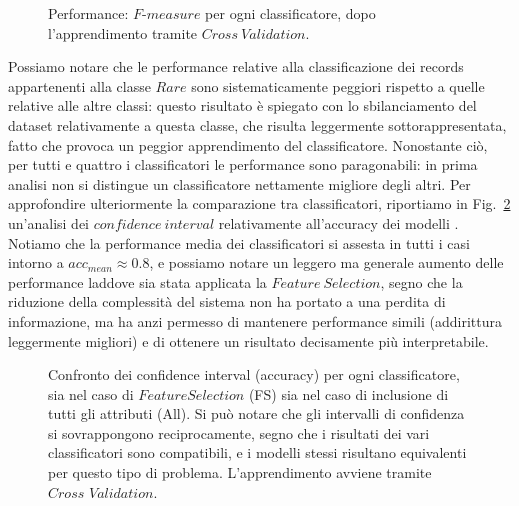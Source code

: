 \documentclass[fleqn,10pt]{SelfArx} %
\begin{document}
\begin{figure}
\caption{ \label{fmeas:fig} Performance: $F$-$measure$ per ogni classificatore, dopo l'apprendimento tramite $Cross\ Validation$.}
\end{figure}
Possiamo notare che le performance relative alla classificazione dei records appartenenti alla classe $Rare$ sono sistematicamente peggiori rispetto a quelle relative alle altre classi: questo risultato è spiegato con lo sbilanciamento del dataset relativamente a questa classe, che risulta leggermente sottorappresentata, fatto che provoca un peggior apprendimento del classificatore.
Nonostante ciò, per tutti e quattro i classificatori le performance sono paragonabili: in prima analisi non si distingue un classificatore nettamente migliore degli altri.
Per approfondire ulteriormente la comparazione tra classificatori, riportiamo in Fig.~\ref{confidence:fig} un'analisi dei $confidence \ interval$ relativamente all'accuracy dei modelli \cite{tan}.
Notiamo che la performance media dei classificatori si assesta in tutti i casi intorno a $acc_{mean}\approx 0.8$, e possiamo notare un leggero ma generale aumento delle performance laddove sia stata applicata la $Feature\ Selection$, segno che la riduzione della complessità del sistema non ha portato a una perdita di informazione, ma ha anzi permesso di mantenere performance simili (addirittura leggermente migliori) e di ottenere un risultato decisamente più interpretabile.

\begin{figure}
\caption{ \label{confidence:fig} Confronto dei confidence interval (accuracy) per ogni classificatore, sia nel caso di $Feature Selection$ (FS) sia nel caso di inclusione di tutti gli attributi (All). Si può notare che gli intervalli di confidenza si sovrappongono reciprocamente, segno che i risultati dei vari classificatori sono compatibili, e i modelli stessi risultano equivalenti per questo tipo di problema.
L'apprendimento avviene tramite $Cross$ $Validation$.}
\end{figure}
\end{document}
